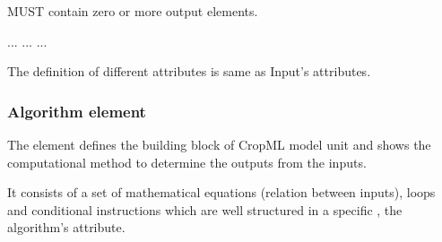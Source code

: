 \documentclass[letterpaper,10pt,english]{sphinxmanual}
\begin{document}
 MUST contain zero or more output elements.

%
\begin{sphinxVerbatim}[commandchars=\\\{\}]
    
   ...
              
              
      ...
   ...
\end{sphinxVerbatim}

\begin{DUlineblock}{0em}
\item[] The definition of different attributes is same as Input’s attributes.
\end{DUlineblock}


\subsubsection{Algorithm element}
\label{\detokenize{user/description:algorithm-element}}
\begin{DUlineblock}{0em}
\item[] The  element defines the building block of CropML model unit and shows the computational method to determine
the outputs from the inputs.
\item[] It consists of a set of mathematical equations (relation between inputs), loops and conditional instructions
which are well structured in a specific , the algorithm’s attribute.
\end{DUlineblock}
\end{document}
